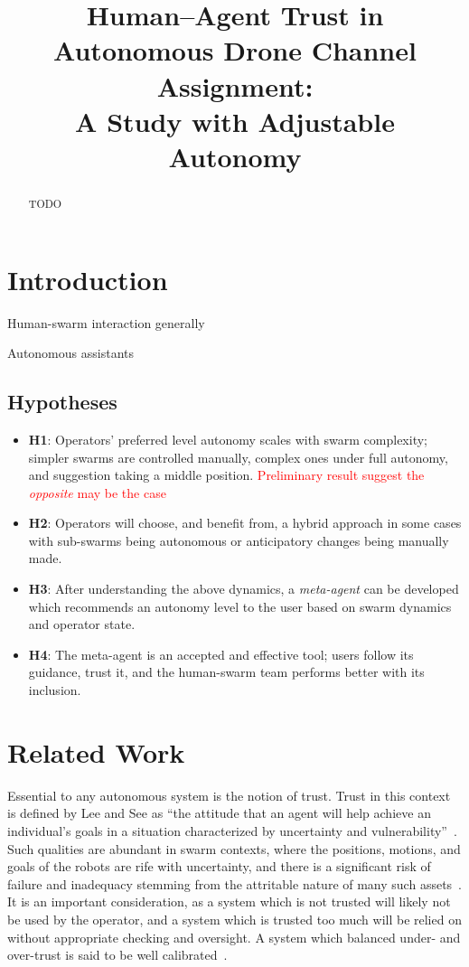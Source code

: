 \documentclass[10pt]{article}
\title{Human--Agent Trust in Autonomous Drone Channel Assignment:\\
       A Study with Adjustable Autonomy}
\author{}
\date{}
\theoremstyle{definition}
\begin{document}
\maketitle

\begin{abstract}
TODO
\end{abstract}

\section{Introduction}\label{sec:intro}
Human-swarm interaction generally

Autonomous assistants

\subsection{Hypotheses}
\begin{itemize}
    \item \textbf{H1}: Operators' preferred level autonomy scales with swarm complexity; simpler swarms are controlled manually, complex ones under full autonomy, and suggestion taking a middle position. \textcolor{red}{Preliminary result suggest the \textit{opposite} may be the case}
    \item \textbf{H2}: Operators will choose, and benefit from, a hybrid approach in some cases with sub-swarms being autonomous or anticipatory changes being manually made.
    \item \textbf{H3}: After understanding the above dynamics, a \textit{meta-agent} can be developed which recommends an autonomy level to the user based on swarm dynamics and operator state.
    \item \textbf{H4}: The meta-agent is an accepted and effective tool; users follow its guidance, trust it, and the human-swarm team performs better with its inclusion.
\end{itemize}


\section{Related Work}\label{sec:relatedwork}
Essential to any autonomous system is the notion of trust. Trust in this context is defined by Lee and See as ``the attitude that an agent will help achieve an individual’s goals in a situation characterized by uncertainty and vulnerability''~\cite{lee2004trust}. Such qualities are abundant in swarm contexts, where the positions, motions, and goals of the robots are rife with uncertainty, and there is a significant risk of failure and inadequacy stemming from the attritable nature of many such assets~\cite{SOMETHING ABOUT AN EXAMPLE OF A SWARM?}. It is an important consideration, as a system which is not trusted will likely not be used by the operator, and a system which is trusted too much will be relied on without appropriate checking and oversight. A system which balanced under- and over-trust is said to be well calibrated~\cite{mcdermott2019practical}. 
\end{document}
